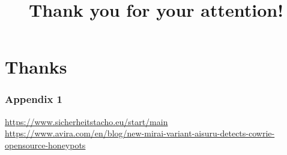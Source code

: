 \documentclass[11pt,t,usepdftitle=false,aspectratio=169]{beamer}
\begin{document}
\title{Thank you for your attention!}
\subtitle{}
\section{Thanks}


\appendix

\begin{frame}
\frametitle{Appendix 1}
    \url{https://www.sicherheitstacho.eu/start/main} \\
    \url{https://www.avira.com/en/blog/new-mirai-variant-aisuru-detects-cowrie-opensource-honeypots}
\end{frame}

\end{document}
